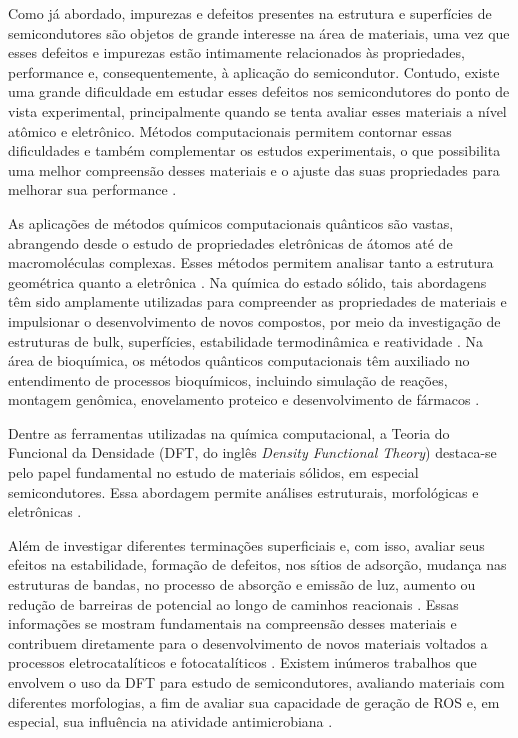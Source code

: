 Como já abordado, impurezas e defeitos presentes na estrutura e superfícies de 
semicondutores são objetos de grande interesse na área de materiais, uma vez que esses defeitos e impurezas estão intimamente relacionados às propriedades, performance e, consequentemente, à aplicação do semicondutor. Contudo, existe uma grande dificuldade em estudar esses defeitos nos semicondutores do ponto de vista experimental, principalmente quando se tenta avaliar esses materiais a nível atômico e eletrônico. Métodos computacionais permitem contornar essas dificuldades e também complementar os estudos experimentais, o que possibilita uma melhor compreensão desses materiais e o ajuste das suas propriedades para melhorar sua performance \cite{van2008computational}.

As aplicações de métodos químicos computacionais quânticos são vastas, abrangendo desde o estudo de propriedades eletrônicas de átomos até de macromoléculas complexas. Esses métodos permitem analisar tanto a estrutura geométrica quanto a eletrônica \cite{liu2023performance,wang2025photophysical,rodrigues2025electron}. Na química do estado sólido, tais abordagens têm sido amplamente utilizadas para compreender as propriedades de materiais e impulsionar o desenvolvimento de novos compostos, por meio da investigação de estruturas de bulk, superfícies, estabilidade termodinâmica e reatividade \cite{butler2016computational}. Na área de bioquímica, os métodos quânticos computacionais têm auxiliado no entendimento de processos bioquímicos, incluindo simulação de reações, montagem genômica, enovelamento proteico e desenvolvimento de fármacos \cite{fedorov2021towards}.

Dentre as ferramentas utilizadas na química computacional, a Teoria do Funcional da Densidade (DFT, do inglês \textit{Density Functional Theory}) destaca-se pelo papel fundamental no estudo de materiais sólidos, em especial semicondutores. Essa abordagem permite análises estruturais, morfológicas e eletrônicas \cite{cabral2025lighting,gouveia2018reading,da2022diagnosis,gouveia2024whats}.

Além de investigar diferentes terminações superficiais e, com isso, avaliar seus efeitos na estabilidade, formação de defeitos, nos sítios de adsorção, mudança nas estruturas de bandas, no processo de absorção e emissão de luz, aumento ou redução de barreiras de potencial ao longo de caminhos reacionais \cite{wu2021thermodynamic,da2021dft,teodoro2022connecting,barrionuevo2022theoretical}. Essas informações se mostram fundamentais na compreensão desses materiais e contribuem diretamente para o desenvolvimento de novos materiais voltados a processos eletrocatalíticos \cite{bhati2020density,ren2020activating} e fotocatalíticos \cite{andrade2023enhanced,gouveia2022surfactant,han2023combination}. Existem inúmeros trabalhos que envolvem o uso da DFT para estudo de semicondutores, avaliando materiais com diferentes morfologias, a fim de avaliar sua capacidade de geração de ROS \cite{li2019enhanced,xu2023new,de2025first} e, em especial, sua influência na atividade antimicrobiana \cite{neto2023effect,lipsky2023tale,assis2021surface,roca2021selective,macedo2019tailoring}. 

